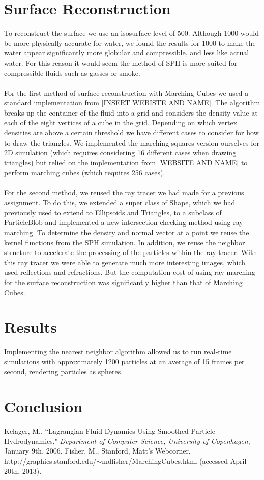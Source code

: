 \documentclass[11pt]{article}
\begin{document}
\section*{Surface Reconstruction}
To reconstruct the surface we use an isosurface level of 500. Although 1000 would be more physically accurate for water, we found the results for 1000 to make the water appear significantly more globular and compressible, and less like actual water. For this reason it would seem the method of SPH is more suited for compressible fluids such as gasses or smoke.
\\
\\
For the first method of surface reconstruction with Marching Cubes we used a standard implementation from [INSERT WEBISTE AND NAME]. The algorithm breaks up the container of the fluid into a grid and considers the density value at each of the eight vertices of a cube in the grid. Depending on which vertex densities are above a certain threshold we have different cases to consider for how to draw the triangles. We implemented the marching squares version ourselves for 2D simulation (which requires considering 16 different cases when drawing triangles) but relied on the implementation from [WEBSITE AND NAME] to perform marching cubes (which requires 256 cases).
\\
\\
For the second method, we reused the ray tracer we had made for a previous assignment. To do this, we extended a super class of Shape, which we had previously used to extend to Ellipsoids and Triangles, to a subclass of ParticleBlob and implemented a new intersection checking method using ray marching. To determine the density and normal vector at a point we reuse the kernel functions from the SPH simulation. In addition, we reuse the neighbor structure to accelerate the processing of the particles within the ray tracer. With this ray tracer we were able to generate much more interesting images, which used reflections and refractions. But the computation cost of using ray marching for the surface reconstruction was significantly higher than that of Marching Cubes.

\section*{Results}
Implementing the nearest neighbor algorithm allowed us to run real-time simulations with approximately 1200 particles at an average of 15 frames per second, rendering particles as spheres. 

\section*{Conclusion}

\begin{thebibliography}{5} 
 Kelager, M., ``Lagrangian Fluid Dynamics Using Smoothed Particle Hydrodynamics," \emph{Department of Computer Science, University of Copenhagen}, January 9th, 2006.
 Fisher, M., Stanford, Matt's Webcorner, 
\\ http://graphics.stanford.edu/$\sim$mdfisher/MarchingCubes.html (accessed April 20th, 2013).
\end{thebibliography}
\end{document}
